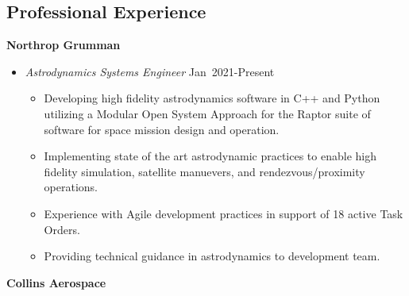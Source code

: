 \subsection*{Professional Experience}
{}

\textbf{Northrop Grumman}

\begin{itemize}
    \item[] \textit{Astrodynamics Systems Engineer} \hfill {Jan~2021-Present}
        \begin{itemize}
            \item Developing high fidelity astrodynamics software in C++ and Python utilizing a Modular Open System Approach for the Raptor suite of software for space mission design and operation. 
            \item Implementing state of the art astrodynamic practices to enable high fidelity simulation, satellite manuevers, and rendezvous/proximity operations. 
            \item Experience with Agile development practices in support of 18 active Task Orders. 
            \item Providing technical guidance in astrodynamics to development team.
        \end{itemize}
\end{itemize}
\textbf{Collins Aerospace}

